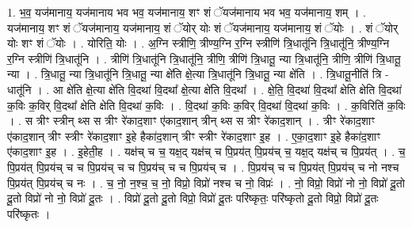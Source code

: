 \documentclass[17pt]{extarticle}
\begin{document}
1. भ॒व॒ यज॑मानाय॒ यज॑मानाय भव भव॒ यज॑मानाय॒ शꣳ शं ॅयज॑मानाय भव भव॒ यज॑मानाय॒ शम् । . यज॑मानाय॒ शꣳ शं ॅयज॑मानाय॒ यज॑मानाय॒ शं ॅयोर् योः शं ॅयज॑मानाय॒ यज॑मानाय॒ शं ॅयोः । . शं ॅयोर् योः शꣳ शं ॅयोः । . योरिति॒ योः । . अ॒ग्नि स्त्रीणि॒ त्रीण्य॒ग्नि र॒ग्नि स्त्रीणि॑ त्रि॒धातू॑नि त्रि॒धातू॑नि॒ त्रीण्य॒ग्नि र॒ग्नि स्त्रीणि॑ त्रि॒धातू॑नि । . त्रीणि॑ त्रि॒धातू॑नि त्रि॒धातू॑नि॒ त्रीणि॒ त्रीणि॑ त्रि॒धातू॒ न्या त्रि॒धातू॑नि॒ त्रीणि॒ त्रीणि॑ त्रि॒धातू॒ न्या । . त्रि॒धातू॒ न्या त्रि॒धातू॑नि त्रि॒धातू॒ न्या क्षे॑ति क्षे॒त्या त्रि॒धातू॑नि त्रि॒धातू॒ न्या क्षे॑ति । . त्रि॒धातू॒नीति॑ त्रि - धातू॑नि । . आ क्षे॑ति क्षे॒त्या क्षे॑ति वि॒दथा॑ वि॒दथा᳚ क्षे॒त्या क्षे॑ति वि॒दथा᳚ । . क्षे॒ति॒ वि॒दथा॑ वि॒दथा᳚ क्षेति क्षेति वि॒दथा॑ क॒विः क॒विर् वि॒दथा᳚ क्षेति क्षेति वि॒दथा॑ क॒विः । . वि॒दथा॑ क॒विः क॒विर् वि॒दथा॑ वि॒दथा॑ क॒विः । . क॒विरिति॑ क॒विः । . स त्रीꣳ स्त्रीन् थ्स स त्रीꣳ रे॑काद॒शाꣳ ए॑काद॒शान् त्रीन् थ्स स त्रीꣳ रे॑काद॒शान् । . त्रीꣳ रे॑काद॒शाꣳ ए॑काद॒शान् त्रीꣳ स्त्रीꣳ रे॑काद॒शाꣳ इ॒हे हैका॑द॒शान् त्रीꣳ स्त्रीꣳ रे॑काद॒शाꣳ इ॒ह । . ए॒का॒द॒शाꣳ इ॒हे हैका॑द॒शाꣳ ए॑काद॒शाꣳ इ॒ह । . इ॒हेती॒ह । . यक्ष॑च् च च॒ यक्ष॒द् यक्ष॑च् च पि॒प्रय॑त् पि॒प्रय॑च् च॒ यक्ष॒द् यक्ष॑च् च पि॒प्रय॑त् । . च॒ पि॒प्रय॑त् पि॒प्रय॑च् च च पि॒प्रय॑च् च च पि॒प्रय॑च् च च पि॒प्रय॑च् च । . पि॒प्रय॑च् च च पि॒प्रय॑त् पि॒प्रय॑च् च नो नश्च पि॒प्रय॑त् पि॒प्रय॑च् च नः । . च॒ नो॒ न॒श्च॒ च॒ नो॒ विप्रो॒ विप्रो॑ नश्च च नो॒ विप्रः॑ । . नो॒ विप्रो॒ विप्रो॑ नो नो॒ विप्रो॑ दू॒तो दू॒तो विप्रो॑ नो नो॒ विप्रो॑ दू॒तः । . विप्रो॑ दू॒तो दू॒तो विप्रो॒ विप्रो॑ दू॒तः परि॑ष्कृतः॒ परि॑ष्कृतो दू॒तो विप्रो॒ विप्रो॑ दू॒तः परि॑ष्कृतः । \newline
\end{document}
